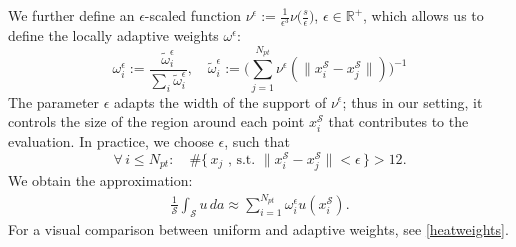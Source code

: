 \documentclass[12pt,openany]{book}
\newcommand{\R}{\mathbb{R}}
\def\S{\mathcal{S}}
\theoremstyle{plainnormal}
\theoremstyle{remark}
\begin{document}
We further define an $\epsilon$-scaled function $\nu^\epsilon := \frac{1}{\epsilon ^3}\nu\big(\frac{s}{\epsilon}\big)$, $\epsilon \in \R^+$, which allows us to define the locally adaptive weights $\omega^\epsilon$:
$$\omega_i^\epsilon:= \frac{\tilde{\omega}_i^\epsilon}{\sum_i\tilde{\omega}_i^\epsilon}, \quad \tilde{\omega}_i^\epsilon:= \Bigg(\sum_{j=1}^{N_{pt}}\nu^\epsilon(\|x_i^\S-x_j^\S\|)\Bigg)^{-1}$$
The parameter $\epsilon$ adapts the width of the support of $\nu^\epsilon$; thus in our setting, it controls the size of the region around each point \( x_i^{\mathcal{S}} \) that contributes to the evaluation. In practice, we choose $\epsilon$, such that$$\forall\, i \leq N_{pt}:\quad\#\{\,x_j \text{ , s.t. } \|x_i^\S - x_j^\S\| < \epsilon\,\} > 12.$$ 
We obtain the approximation: 
\begin{align}\label{weighted_sum_heat}
    \frac{1}{\S}\int_\S u\, da\approx \sum_{i=1}^{N_{pt}}\omega_i^\epsilon u(x_i^\S).
\end{align}
For a visual comparison between uniform and adaptive weights, see \cref{heatweights}.
\end{document}
